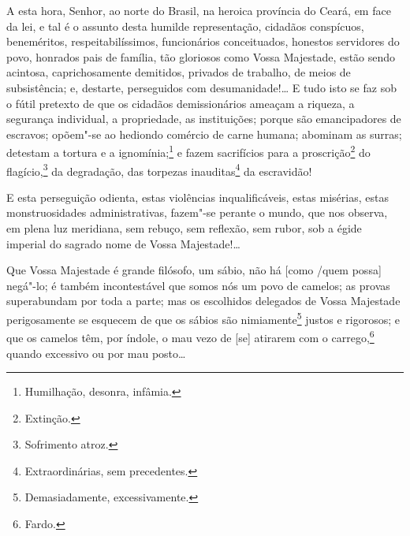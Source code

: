 A esta hora, Senhor, ao norte do Brasil, na heroica província do Ceará,
em face da lei, e tal é o assunto desta humilde representação, cidadãos
conspícuos, beneméritos, respeitabilíssimos, funcionários conceituados,
honestos servidores do povo, honrados pais de família, tão gloriosos
como Vossa Majestade, estão sendo acintosa, caprichosamente demitidos,
privados de trabalho, de meios de subsistência; e, destarte, perseguidos
com desumanidade!\ldots{} E tudo isto se faz sob o fútil pretexto de que os
cidadãos demissionários ameaçam a riqueza, a segurança individual, a
propriedade, as instituições; porque são emancipadores de escravos;
opõem"-se ao hediondo comércio de carne humana; abominam as surras;
detestam a tortura e a ignomínia;\footnote{Humilhação, desonra,
  infâmia.} e fazem sacrifícios para a proscrição\footnote{Extinção.}
do flagício,\footnote{Sofrimento atroz.} da degradação, das torpezas
inauditas\footnote{Extraordinárias, sem precedentes.} da escravidão!

E esta perseguição odienta, estas violências inqualificáveis, estas
misérias, estas monstruosidades administrativas, fazem"-se perante o
mundo, que nos observa, em plena luz meridiana, sem rebuço, sem
reflexão, sem rubor, sob a égide imperial do sagrado nome de Vossa
Majestade!\ldots{}

Que Vossa Majestade é grande filósofo, um sábio, não há {[}como /quem
possa{]} negá"-lo; é também incontestável que somos nós um povo de
camelos; as provas superabundam por toda a parte; mas os escolhidos
delegados de Vossa Majestade perigosamente se esquecem de que os sábios
são nimiamente\footnote{Demasiadamente, excessivamente.} justos e
rigorosos; e que os camelos têm, por índole, o mau vezo de {[}se{]}
atirarem com o carrego,\footnote{Fardo.} quando excessivo ou por mau
posto\ldots{}


